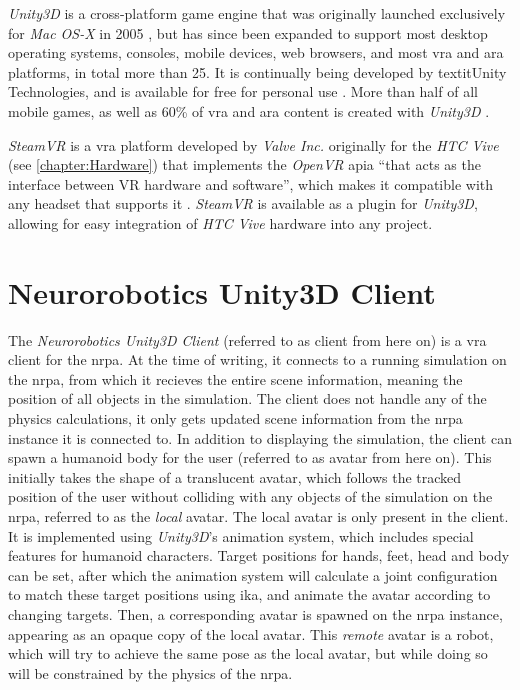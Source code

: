 \textit{Unity3D} is a cross-platform game engine that was originally launched exclusively for \textit{Mac OS-X} in 2005 \autocite{unityAt10}, but has since been expanded to support most desktop operating systems, consoles, mobile devices, web browsers, and most \gls{vra} and \gls{ara} platforms, in total more than 25. It is continually being developed by textit{Unity Technologies}, and is available for free for personal use \autocite{unity}.
\newline
More than half of all mobile games, as well as 60\% of \gls{vra} and \gls{ara} content is created with \textit{Unity3D} \autocite{deepMindPartner}.
\newline

\textit{SteamVR} is a \gls{vra} platform developed by \textit{Valve Inc.} originally for the \textit{HTC Vive} (see \autoref{chapter:Hardware}) that implements the \textit{OpenVR} \gls{apia} \enquote{that acts as the interface between VR hardware and software}, which makes it compatible with any headset that supports it \autocite{steamVRArticle}.
\newline
\textit{SteamVR} is available as a plugin for \textit{Unity3D}, allowing for easy integration of \textit{HTC Vive} hardware into any project.



\section{Neurorobotics Unity3D Client}

The \textit{Neurorobotics Unity3D Client} (referred to as client from here on) is a \gls{vra} client for the \gls{nrpa}. At the time of writing, it connects to a running simulation on the \gls{nrpa}, from which it recieves the entire scene information, meaning the position of all objects in the simulation. The client does not handle any of the physics calculations, it only gets updated scene information from the \gls{nrpa} instance it is connected to.
\newline
In addition to displaying the simulation, the client can spawn a humanoid body for the user (referred to as avatar from here on).
\newline 
This initially takes the shape of a translucent avatar, which follows the tracked position of the user without colliding with any objects of the simulation on the \gls{nrpa}, referred to as the \textit{local} avatar. The local avatar is only present in the client. It is implemented using \textit{Unity3D}'s animation system, which includes special features for humanoid characters. Target positions for hands, feet, head and body can be set, after which the animation system will calculate a joint configuration to match these target positions using \gls{ika}, and animate the avatar according to changing targets.
\newline
Then, a corresponding avatar is spawned on the \gls{nrpa} instance, appearing as an opaque copy of the local avatar. This \textit{remote} avatar is a robot, which will try to achieve the same pose as the local avatar, but while doing so will be constrained by the physics of the \gls{nrpa}.

